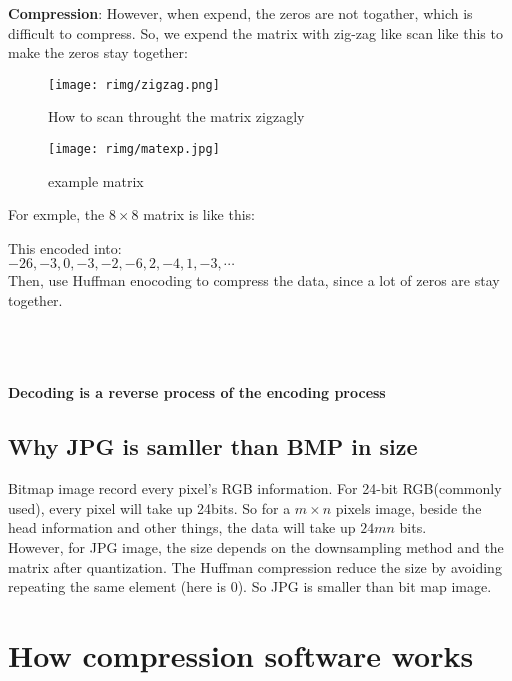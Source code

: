 \documentclass{article}
\begin{document}
	\textbf{Compression}:
	However, when expend, the zeros are not togather, which is difficult to compress. So, we expend the matrix with zig-zag like scan like this to make the zeros stay together:\\
	
	\newpage
	

	\begin{figure}[h]
		\texttt{[image: rimg/zigzag.png]}
		\caption{How to scan throught the matrix zigzagly}

	\end{figure}


	\begin{figure}[h]
		\texttt{[image: rimg/matexp.jpg]}
		\caption{example matrix}
	\end{figure}

	For exmple, the $8 \times 8$ matrix is like this:\\

	\newpage

	This encoded into: \\
	$-26,-3,0,-3,-2,-6,2,-4,1,-3, \cdots$ \\

	Then, use Huffman enocoding to compress the data, since a lot of zeros are stay together.

	\\ \cite{ref1} \cite{ref2} \cite{ref4}
\\\\
	\textbf{Decoding is a reverse process of the encoding process}


	\subsection{Why JPG is samller than BMP in size}
	Bitmap image record every pixel's RGB information. For 24-bit RGB(commonly used), every pixel will take up 24bits. So for a $m \times n$ pixels image, beside the head information and other things, the data will take up $24mn$ bits. \\

	However, for JPG image, the size depends on the downsampling method and the matrix after quantization. The Huffman compression reduce the size by avoiding repeating the same element (here is $0$). So JPG is smaller than bit map image.



\newpage
\section{How compression software works}
\end{document}
